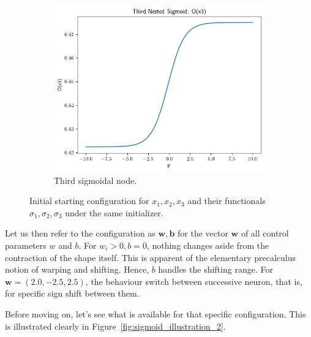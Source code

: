 \begin{figure}[htbp]
\begin{subfigure}[b]{0.32\textwidth}
    \label{fig:a_sigmoid_2}
  \end{subfigure}\hfill
  \begin{subfigure}[b]{0.32\textwidth}
    \centering
    \includegraphics[width=\textwidth]{img/sigmoid_illus_x3.png}
    \caption{Third sigmoidal node.}
    \label{fig:a_sigmoid_3}
  \end{subfigure}

  \caption{Initial starting configuration for \(x_{1}, x_{2}, x_{3}\) and their functionals \(\sigma_{1}, \sigma_{2}, \sigma_{3}\) under the same initializer.}
  \label{fig:sigmoid_illustration_1}
\end{figure}

Let us then refer to the configuration as $\mathbf{w}, \mathbf{b}$ for the vector $\mathbf{w}$ of all control parameters $w$ and $b$. For $w_{i}>0, b=0$, nothing changes aside from the contraction of the shape itself. This is apparent of the elementary precalculus notion of warping and shifting. Hence, $b$ handles the shifting range. For $\mathbf{w}=(2.0,-2.5,2.5)$, the behaviour switch between successive neuron, that is, for specific sign shift between them. 

Before moving on, let's see what is available for that specific configuration. This is illustrated clearly in Figure~\ref{fig:sigmoid_illustration_2}.

